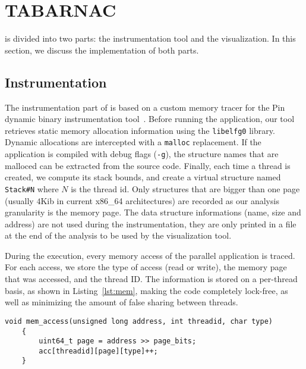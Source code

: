 
\section{TABARNAC}
\label{sec:design}

\TABARNAC is divided into two parts: the instrumentation tool and the
visualization. In this section, we discuss the implementation of both parts.

\subsection{Instrumentation}
\label{sec:design-impl}

The instrumentation part of \TABARNAC is based on a custom memory tracer for the Pin dynamic binary instrumentation tool~\cite{Luk05Pin}.
Before running the application, our tool retrieves static memory allocation
information using the \texttt{libelfg0} library. Dynamic allocations are
intercepted with a \texttt{malloc} replacement. If the application is
compiled with debug flags (\texttt{-g}), the structure names that are malloced can be extracted from the source
code. Finally, each time a thread is created, we compute
its stack bounds, and create a virtual structure named \texttt{Stack\#N} where
$N$ is the thread id. Only structures that are bigger than one page (usually
$4$Kib in current x86\_64 architectures) are recorded as our
analysis granularity is the memory page. The data structure informations (name,
size and address) are not used during the instrumentation, they are only
printed in a file at the end of the analysis to be used by the visualization
tool.

During the execution, every memory access of the parallel application is traced.
For each access, we store the type of access (read or write), the memory page that was accessed, and the thread ID.
The information is stored on a per-thread basis, as shown in
Listing~\ref{lst:mem}, making the code completely lock-free, as well as minimizing the amount of false sharing between threads.

\begin{lstlisting}[caption={Code executed on each memory access. The \texttt{address}, \texttt{threadid} and \texttt{type} parameters are provided by Pin.},label=lst:mem]
	void mem_access(unsigned long address, int threadid, char type)
	{
		uint64_t page = address >> page_bits;
		acc[threadid][page][type]++;
	}

\end{lstlisting}


